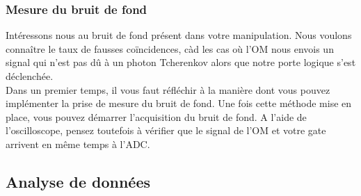 \subsubsection{Mesure du bruit de fond}

Intéressons nous au bruit de fond présent dans votre manipulation. Nous voulons connaître le taux de fausses coïncidences, càd les cas où l'OM nous envois un signal qui n'est pas dû à un photon Tcherenkov alors que notre porte logique s'est déclenchée. \\

Dans un premier temps, il vous faut réfléchir à la manière dont vous pouvez implémenter la prise de mesure du bruit de fond. Une fois cette méthode mise en place, vous pouvez démarrer l'acquisition du bruit de fond. A l'aide de l'oscilloscope, pensez toutefois à vérifier que le signal de l'OM et votre gate arrivent en même temps à l'ADC.


\subsection{Analyse de donn\'ees}

